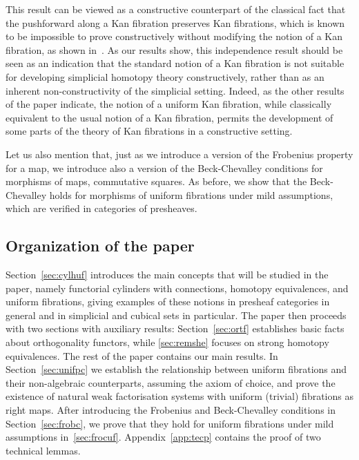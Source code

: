 \documentclass[reqno,10pt,a4paper,oneside,draft]{amsart}
\begin{document}
This result can be viewed as a constructive counterpart of the classical fact that the pushforward along a Kan fibration preserves Kan fibrations, which is known to be impossible to prove constructively without modifying the notion of a Kan fibration, as shown in~\cite{coquand-non-constructivity-kan}.
As our results show, this independence result should be seen as an indication that the standard notion of a Kan fibration is not suitable for developing simplicial homotopy theory constructively, rather than as an inherent non-constructivity of the simplicial setting.
Indeed, as the other results of the paper indicate, the notion of a uniform Kan fibration, while classically equivalent to the usual notion of a Kan fibration, permits the development of some parts of the theory of Kan fibrations in a constructive setting.

Let us also mention that, just as we introduce a version of the Frobenius property for a map, we introduce also a version of the Beck-Chevalley conditions for morphisms of maps, \ie commutative squares.
As before, we show that the Beck-Chevalley holds for morphisms of uniform fibrations under mild assumptions, which are verified in categories of presheaves.

\subsection*{Organization of the paper}

Section~\ref{sec:cylhuf} introduces the main concepts that will be studied in the paper, namely functorial cylinders with connections, homotopy equivalences, and uniform fibrations, giving examples of these notions in presheaf categories in general and in simplicial and cubical sets in particular.
The paper then proceeds with two sections with auxiliary results: Section~\ref{sec:ortf} establishes basic facts about orthogonality functors, while \cref{sec:remshe} focuses on strong homotopy equivalences.
The rest of the paper contains our main results.
In Section~\ref{sec:unifpc} we establish the relationship between uniform fibrations and their non-algebraic counterparts, assuming the axiom of choice, and prove the existence of natural weak factorisation systems with uniform (trivial) fibrations as right maps.
After introducing the Frobenius and Beck-Chevalley conditions in Section~\ref{sec:frobc}, we prove that they hold for uniform fibrations under mild assumptions in~\cref{sec:frocuf}.
Appendix~\ref{app:tecp} contains the proof of two technical lemmas.
\end{document}
